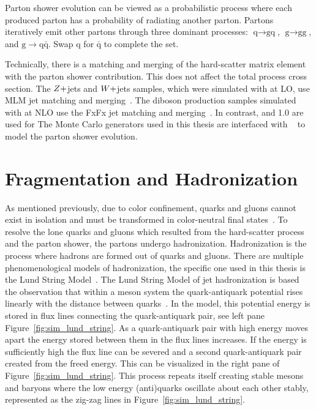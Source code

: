 Parton shower evolution can be viewed as a probabilistic process 
where each produced parton has a probability
of radiating another parton. Partons iteratively emit other partons through three 
dominant processes: $\textrm{q} \to \textrm{gq}$, $\textrm{g} \to \textrm{gg}$, 
and $\textrm{g} \to \textrm{q}\bar{\textrm{q}}$. Swap $\textrm{q}$ for $\bar{\textrm{q}}$
to complete the set. 

Technically, there is a matching and merging of the hard-scatter matrix element with the
parton shower contribution. This does not affect the total process cross section.
The $Z+$jets and $W+$jets samples, which were simulated with \MGAMCNLO at LO, 
use MLM jet matching and merging~\cite{Alwall:2007fs}.
The diboson production samples simulated with \MGAMCNLO at NLO use the 
FxFx jet matching and merging~\cite{Frederix:2012ps}. 
In contrast,  and 1.0 are used for \ttbar
The Monte Carlo generators used in this thesis are interfaced with 
~\cite{Sjostrand:2014zea} to model the parton shower evolution.



\section{Fragmentation and Hadronization}
As mentioned previously, due to color confinement, quarks and gluons cannot exist in isolation
and must be transformed in color-neutral final states~\cite{Hoche:2014rga}. 
To resolve the lone quarks and gluons which resulted from the hard-scatter process and the parton 
shower, the partons undergo hadronization. Hadronization is the process where hadrons are formed 
out of quarks and gluons. There are multiple phenomenological models of hadronization, the
specific one used in this thesis is the Lund String Model~\cite{Sjostrand:1985ys}. 
The Lund String Model of jet
hadronization is based the observation that within a meson system the quark-antiquark 
potential rises linearly with the distance between quarks~\cite{Bali:1992ab}. In the model, this
potential energy is stored in flux lines connecting the quark-antiquark pair, see left pane 
Figure~\ref{fig:sim_lund_string}. As a quark-antiquark 
pair with high energy moves apart the energy stored between them in the flux lines increases. If the energy
is sufficiently high the flux line can be severed and a second quark-antiquark pair created from
the freed energy. This can be visualized in the right pane of Figure~\ref{fig:sim_lund_string}.
This process repeats itself creating stable mesons and baryons where the low energy (anti)quarks
oscillate about each other stably, represented as the zig-zag lines in Figure~\ref{fig:sim_lund_string}.

